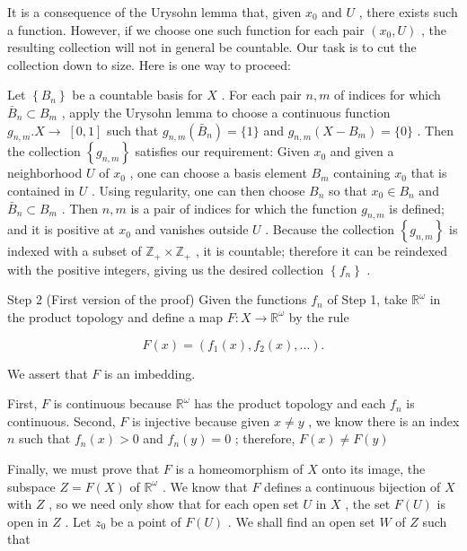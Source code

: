 \documentclass[10pt]{article}
\begin{document}
It is a consequence of the Urysohn lemma that, given \({x}_{0}\) and \(U\) , there exists such a function. However, if we choose one such function for each pair \(\left( {{x}_{0},U}\right)\) , the resulting collection will not in general be countable. Our task is to cut the collection down to size. Here is one way to proceed:

Let \(\left\{  {B}_{n}\right\}\) be a countable basis for \(X\) . For each pair \(n,m\) of indices for which \({\bar{B}}_{n} \subset  {B}_{m}\) , apply the Urysohn lemma to choose a continuous function \({g}_{n,m}.X \rightarrow \; \left\lbrack  {0,1}\right\rbrack\) such that \({g}_{n,m}\left( {\bar{B}}_{n}\right)  = \{ 1\}\) and \({g}_{n,m}\left( {X - {B}_{m}}\right)  = \{ 0\}\) . Then the collection \(\left\{  {g}_{n,m}\right\}\) satisfies our requirement: Given \({x}_{0}\) and given a neighborhood \(U\) of \({x}_{0}\) , one can choose a basis element \({B}_{m}\) containing \({x}_{0}\) that is contained in \(U\) . Using regularity, one can then choose \({B}_{n}\) so that \({x}_{0} \in  {B}_{n}\) and \({\bar{B}}_{n} \subset  {B}_{m}\) . Then \(n,m\) is a pair of indices for which the function \({g}_{n,m}\) is defined; and it is positive at \({x}_{0}\) and vanishes outside \(U\) . Because the collection \(\left\{  {g}_{n,m}\right\}\) is indexed with a subset of \({\mathbb{Z}}_{ + } \times  {\mathbb{Z}}_{ + }\) , it is countable; therefore it can be reindexed with the positive integers, giving us the desired collection \(\left\{  {f}_{n}\right\}\) .

Step 2 (First version of the proof) Given the functions \({f}_{n}\) of Step 1, take \({\mathbb{R}}^{\omega }\) in the product topology and define a map \(F : X \rightarrow  {\mathbb{R}}^{\omega }\) by the rule

\[
F\left( x\right)  = \left( {{f}_{1}\left( x\right) ,{f}_{2}\left( x\right) ,\ldots }\right) .
\]

We assert that \(F\) is an imbedding.

First, \(F\) is continuous because \({\mathbb{R}}^{\omega }\) has the product topology and each \({f}_{n}\) is continuous. Second, \(F\) is injective because given \(x \neq  y\) , we know there is an index \(n\) such that \({f}_{n}\left( x\right)  > 0\) and \({f}_{n}\left( y\right)  = 0\) ; therefore, \(F\left( x\right)  \neq  F\left( y\right)\)

Finally, we must prove that \(F\) is a homeomorphism of \(X\) onto its image, the subspace \(Z = F\left( X\right)\) of \({\mathbb{R}}^{\omega }\) . We know that \(F\) defines a continuous bijection of \(X\) with \(Z\) , so we need only show that for each open set \(U\) in \(X\) , the set \(F\left( U\right)\) is open in \(Z\) . Let \({z}_{0}\) be a point of \(F\left( U\right)\) . We shall find an open set \(W\) of \(Z\) such that
\end{document}
